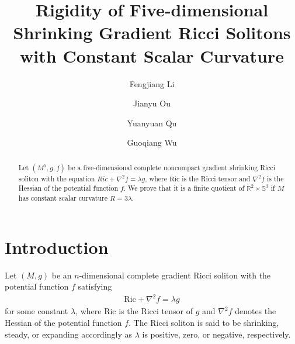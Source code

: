 \documentclass[12pt]{amsart}
\begin{document}
	\newtheorem{defn}[theo]{Definition}
	\newtheorem{ques}[theo]{Question}
	\newtheorem{lem}[theo]{Lemma}
	\newtheorem{prop}[theo]{Proposition}
	\newtheorem{coro}[theo]{Corollary}
	\newtheorem{ex}[theo]{Example}
	\newtheorem{note}[theo]{Note}
	\newtheorem{conj}[theo]{Conjecture}
	\makeatletter
	\makeatother
	
	
	\title[5-dim Ricci Shrinker with CSC]{Rigidity of Five-dimensional Shrinking Gradient Ricci Solitons with Constant Scalar Curvature}
	\author{Fengjiang Li}
	\address[Fengjiang Li]
	{Mathematical Science Research Center, Chongqing University of Technology, Chongqing 400054, China}
	
	\author{Jianyu Ou}
	\address[Jianyu Ou]
	{Department of Mathematics, Xiamen University, Xiamen 361005, China}
	
	\author{Yuanyuan Qu}
	\address[Yuanyuan Qu]{School of Mathematical Sciences,Shanghai Key Laboratory of PMMP, East China Normal University, Shanghai 200241,
		China}
	
	\author{Guoqiang Wu}
	\address[Guoqiang Wu]
	{School of Science, Zhejiang Sci-Tech University, Hangzhou 310018, China}
	
	
	
	
	\date{}
	\maketitle
	
	
	\begin{abstract} Let $(M^5, g, f)$ be a five-dimensional complete noncompact gradient shrinking Ricci soliton with the equation $Ric+\nabla^2f= \lambda g$, where $\text{Ric}$ is the Ricci tensor and $\nabla^2f$ is the Hessian of the potential function $f$. We prove that it is a finite quotient of $\mathbb{R}^2\times \mathbb{S}^3$ if $M$ has constant scalar curvature $R=3 \lambda$.
	\end{abstract}
	
	\section{Introduction}
	Let  $(M, g)$ be an $n$-dimensional complete gradient Ricci soliton with the potential function $f$ satisfying
	\begin{align}\label{soliton}
	\text{Ric}+\nabla^2f=\lambda g
	\end{align}
	for some constant $\lambda$, where $\text{Ric}$ is the Ricci tensor of $g$ and $\nabla^2f$ denotes the Hessian of the potential function $f$.
	The Ricci soliton is said to be shrinking, steady, or expanding accordingly as $\lambda$ is positive, zero, or negative, respectively.
	\smallskip	
	
\end{document}
